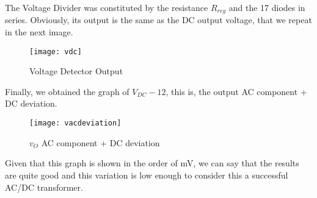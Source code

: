 The Voltage Divider was constituted by the resistance $R_{reg}$ and the 17 diodes in series.
Obviously, its output is the same as the DC output voltage, that we repeat in the next image.
\FloatBarrier
\begin{figure}[h] 
	\centering
	\texttt{[image: vdc]}
	\caption{Voltage Detector Output}
	\label{fig:vvoltage}
\end{figure}
\FloatBarrier

Finally, we obtained the graph of $V_{DC}-12$, this is, the output AC component + DC deviation.
\FloatBarrier
\begin{figure}[h] 
	\centering
	\texttt{[image: vacdeviation]}
	\caption{$v_{O}$ AC component + DC deviation}
	\label{fig:vacdeviation}
\end{figure}
\FloatBarrier

Given that this graph is shown in the order of mV, we can say that the results are quite good and this variation is low enough to consider this a successful AC/DC transformer.
